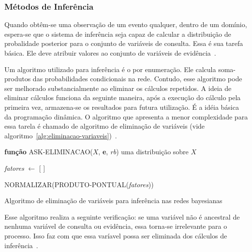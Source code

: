 \subsubsection{Métodos de Inferência}

Quando obtêm-se uma observação de um evento qualquer, dentro de um domínio, espera-se que o sistema de inferência seja capaz de calcular a distribuição de probalidade posterior para o conjunto de variáveis de consulta. Essa é sua tarefa básica. Ele deve atribuir valores ao conjunto de variáveis de evidência~\cite{Russell:2002}.

Um algoritmo utilizado para inferência é o por enumeração. Ele calcula soma-produtos das probabilidades condicionais na rede. Contudo, esse algoritmo pode ser melhorado substancialmente ao eliminar os cálculos repetidos. A ideia de eliminar cálculos funciona da seguinte maneira, após a execução do cálculo pela primeira vez, armazena-se os resultados para futura utilização. É a idéia básica da programação dinâmica. O algoritmo que apresenta a menor complexidade para essa tarela é chamado de algoritmo de eliminação de variáveis (vide algoritmo~\ref{alg:eliminacao-variaveis})~\cite{Russell:2002}.

\begin{algorithm}
    \textbf{função} ASK-ELIMINACAO($X$, \textbf{e}, \emph{rb}) \Retorna uma distribuição sobre $X$

    \emph{fatores} $\gets$ [ ]

    \Retorna NORMALIZAR(PRODUTO-PONTUAL(\emph{fatores}))
    \caption{Algoritmo de eliminação de variáveis para inferência nas redes bayesianas~\cite{Russell:2002}}
    \label{alg:eliminacao-variaveis}
\end{algorithm}

Esse algoritmo realiza a seguinte verificação: se uma variável não é ancestral de nenhuma variável de consulta ou evidência, essa torna-se irrelevante para o processo. Isso faz com que essa varíavel possa ser eliminada dos cálculos de inferência~\cite{Russell:2002}.
